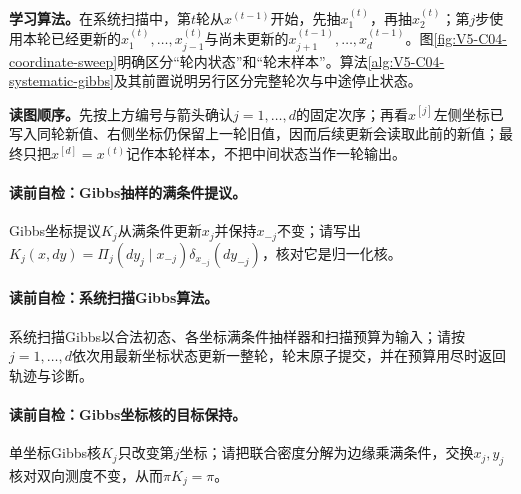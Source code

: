 \label{struct:V5-C04-CH10}
\textbf{学习算法。}在系统扫描中，第$t$轮从$x^{(t-1)}$开始，先抽$x_1^{(t)}$，再抽$x_2^{(t)}$；第$j$步使用本轮已经更新的$x_1^{(t)},\ldots,x_{j-1}^{(t)}$与尚未更新的$x_{j+1}^{(t-1)},\ldots,x_d^{(t-1)}$。图\ref{fig:V5-C04-coordinate-sweep}明确区分“轮内状态”和“轮末样本”。算法\ref{alg:V5-C04-systematic-gibbs}及其前置说明另行区分完整轮次与中途停止状态。

\FloatBarrier
\noindent\textbf{读图顺序。}先按上方编号与箭头确认$j=1,\ldots,d$的固定次序；再看$x^{[j]}$左侧坐标已写入同轮新值、右侧坐标仍保留上一轮旧值，因而后续更新会读取此前的新值；最终只把$x^{[d]}=x^{(t)}$记作本轮样本，不把中间状态当作一轮输出。\par

\paragraph{读前自检：Gibbs抽样的满条件提议。}Gibbs坐标提议$K_j$从满条件更新$x_j$并保持$x_{-j}$不变；请写出$K_j(x,dy)=\Pi_j(dy_j\mid x_{-j})\delta_{x_{-j}}(dy_{-j})$，核对它是归一化核。\par
\paragraph{读前自检：系统扫描Gibbs算法。}系统扫描Gibbs以合法初态、各坐标满条件抽样器和扫描预算为输入；请按$j=1,\ldots,d$依次用最新坐标状态更新一整轮，轮末原子提交，并在预算用尽时返回轨迹与诊断。\par
\paragraph{读前自检：Gibbs坐标核的目标保持。}单坐标Gibbs核$K_j$只改变第$j$坐标；请把联合密度分解为边缘乘满条件，交换$x_j,y_j$核对双向测度不变，从而$\pi K_j=\pi$。\par

\label{struct:V5-C04-CH11}

